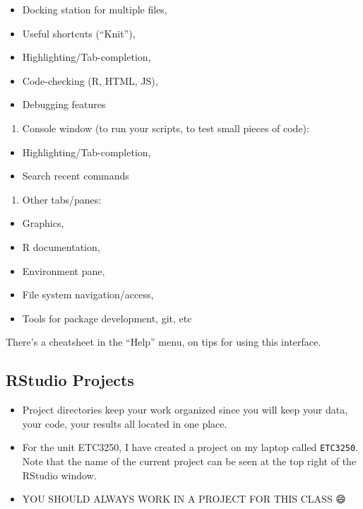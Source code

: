 \documentclass[]{article}
\providecommand{\tightlist}{%
  \setlength{\itemsep}{0pt}\setlength{\parskip}{0pt}}
\begin{document}
\begin{itemize}
\tightlist
\item
  Docking station for multiple files,
\item
  Useful shortcuts (``Knit''),
\item
  Highlighting/Tab-completion,
\item
  Code-checking (R, HTML, JS),
\item
  Debugging features\\
\end{itemize}

\begin{enumerate}
\def\labelenumi{\arabic{enumi}.}
\setcounter{enumi}{1}
\tightlist
\item
  Console window (to run your scripts, to test small pieces of code):
\end{enumerate}

\begin{itemize}
\tightlist
\item
  Highlighting/Tab-completion,
\item
  Search recent commands
\end{itemize}

\begin{enumerate}
\def\labelenumi{\arabic{enumi}.}
\setcounter{enumi}{2}
\tightlist
\item
  Other tabs/panes:
\end{enumerate}

\begin{itemize}
\tightlist
\item
  Graphics,
\item
  R documentation,
\item
  Environment pane,
\item
  File system navigation/access,
\item
  Tools for package development, git, etc
\end{itemize}

There's a cheatsheet in the ``Help'' menu, on tips for using this
interface.

\hypertarget{rstudio-projects}{%
\subsection{RStudio Projects}\label{rstudio-projects}}

\begin{itemize}
\tightlist
\item
  Project directories keep your work organized since you will keep your
  data, your code, your results all located in one place.
\item
  For the unit ETC3250, I have created a project on my laptop called
  \texttt{ETC3250}. Note that the name of the current project can be
  seen at the top right of the RStudio window.
\item
  YOU SHOULD ALWAYS WORK IN A PROJECT FOR THIS CLASS 😄
\end{itemize}
\end{document}
